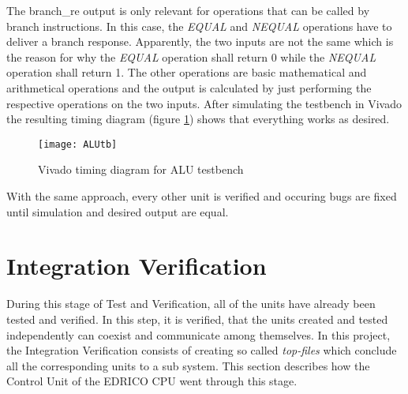 The branch\_re output is only relevant for operations that can be called by branch instructions. In this case, the \textit{EQUAL} and \textit{NEQUAL} operations have to deliver a branch response. Apparently, the two inputs are not the same which is the reason for why the \textit{EQUAL} operation shall return 0 while the \textit{NEQUAL} operation shall return 1. The other operations are basic mathematical and arithmetical operations and the output is calculated by just performing the respective operations on the two inputs. After simulating the testbench in Vivado the resulting timing diagram (figure \ref{fig:alutb}) shows that everything works as desired. 
\begin{figure}[H]
	\centering
	\texttt{[image: ALUtb]}
	\caption{Vivado timing diagram for ALU testbench}
	\label{fig:alutb}
\end{figure}
With the same approach, every other unit is verified and occuring bugs are fixed until simulation and desired output are equal.
\section{Integration Verification}
During this stage of Test and Verification, all of the units have already been tested and verified. In this step, it is verified, that the units created and tested independently can coexist and communicate among themselves. In this project, the Integration Verification consists of creating so called \textit{top-files} which conclude all the corresponding units to a sub system. This section describes how the Control Unit of the EDRICO CPU went through this stage. 

